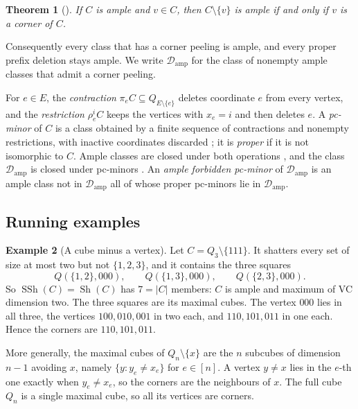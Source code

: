\documentclass[11pt]{article}
\numberwithin{equation}{section}
\newtheorem{theorem}{Theorem}[section]
\theoremstyle{definition}
\newtheorem{example}[theorem]{Example}
\theoremstyle{remark}
\newcommand{\Damp}{\mathcal D_{\mathrm{amp}}}
\newcommand{\Sh}{\operatorname{Sh}}
\newcommand{\SSh}{\operatorname{SSh}}
\begin{document}
\begin{theorem}[{\cite[Lemma~4.1]{ChalopiChepoiMoran22}}]
\label{thm:corner-deletion}
If \(C\) is ample and \(v\in C\), then \(C\setminus\{v\}\) is ample if and
only if \(v\) is a corner of \(C\).
\end{theorem}

Consequently every class that has a corner peeling is ample, and every
proper prefix deletion stays ample.  We write \(\Damp\) for the class of
nonempty ample classes that admit a corner peeling.

For \(e\in E\), the \emph{contraction} \(\pi_eC\subseteq Q_{E\setminus\{e\}}\)
deletes coordinate \(e\) from every vertex, and the \emph{restriction}
\(\rho_e^iC\) keeps the vertices with \(x_e=i\) and then deletes \(e\).
A \emph{pc-minor} of \(C\) is a class obtained by a finite sequence of
contractions and nonempty restrictions, with inactive coordinates
discarded \cite{KnauerMarc20}; it is \emph{proper} if it is not isomorphic
to \(C\).  Ample classes are closed under both operations
\cite[Theorem~3.1]{ChalopiChepoiMoran22}, and the class \(\Damp\) is
closed under pc-minors \cite[Proposition~2.1]{BousquetDampReader}.  An
\emph{ample forbidden pc-minor} of \(\Damp\) is an ample class not in
\(\Damp\) all of whose proper pc-minors lie in \(\Damp\).

\subsection{Running examples}

\begin{example}[A cube minus a vertex]
\label{ex:codim-one}
Let \(C=Q_3\setminus\{111\}\).  It shatters every set of size at most two
but not \(\{1,2,3\}\), and it contains the three squares
\[
 Q(\{1,2\},000),\qquad Q(\{1,3\},000),\qquad Q(\{2,3\},000).
\]
So \(\SSh(C)=\Sh(C)\) has \(7=|C|\) members: \(C\) is ample and maximum of
VC dimension two.  The three squares are its maximal cubes.  The vertex
\(000\) lies in all three, the vertices \(100,010,001\) in two each, and
\(110,101,011\) in one each.  Hence the corners are \(110,101,011\).

More generally, the maximal cubes of \(Q_n\setminus\{x\}\) are the \(n\)
subcubes of dimension \(n-1\) avoiding \(x\), namely
\(\{y:y_e\ne x_e\}\) for \(e\in[n]\).  A vertex \(y\ne x\) lies in the
\(e\)-th one exactly when \(y_e\ne x_e\), so the corners are the
neighbours of \(x\).  The full cube \(Q_n\) is a single maximal cube, so
all its vertices are corners.
\end{example}
\end{document}
